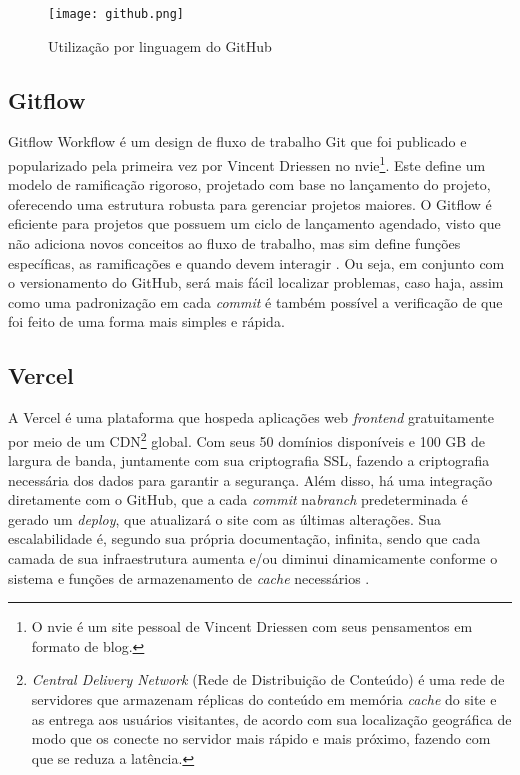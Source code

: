 \begin{figure}[H]
    \caption{\label{utilizacao_github}Utilização por linguagem do GitHub}
    \vspace{5pt}
    \centering
    \texttt{[image: github.png]}
    \vspace{5pt}
\end{figure}

\subsection{Gitflow}
Gitflow Workflow é um design de fluxo de trabalho Git que foi publicado e popularizado pela primeira vez por Vincent Driessen no nvie\footnote{O nvie é um site pessoal de Vincent Driessen com seus pensamentos em formato de blog.}. Este define um modelo de ramificação rigoroso, projetado com base no lançamento do projeto, oferecendo uma estrutura robusta para gerenciar projetos maiores. O Gitflow é eficiente para projetos que possuem um ciclo de lançamento agendado, visto que não adiciona novos conceitos ao fluxo de trabalho, mas sim define funções específicas, as ramificações e quando devem interagir \cite{SANTACROCE}. Ou seja, em conjunto com o versionamento do GitHub, será mais fácil localizar problemas, caso haja, assim como uma padronização em cada \textit{commit} é também possível a verificação de que foi feito de uma forma mais simples e rápida.

\subsection{Vercel}
A Vercel é uma plataforma que hospeda aplicações web \textit{frontend} gratuitamente por meio de um CDN\footnote{\textit{Central Delivery Network} (Rede de Distribuição de Conteúdo) é uma rede de servidores que armazenam réplicas do conteúdo em memória \textit{cache} do site e as entrega aos usuários visitantes, de acordo com sua localização geográfica de modo que os conecte no servidor mais rápido e mais próximo, fazendo com que se reduza a latência.}
global. Com seus 50 domínios disponíveis e 100 GB de largura de banda, juntamente com sua criptografia SSL, fazendo a criptografia necessária dos dados para garantir a segurança. Além disso, há uma integração diretamente com o GitHub, que a cada \textit{commit} na\textit{branch} predeterminada é gerado um \textit{deploy}, que atualizará o site com as últimas alterações. Sua escalabilidade é, segundo sua própria documentação, infinita, sendo que cada camada de sua infraestrutura aumenta e/ou diminui dinamicamente conforme o sistema e funções de armazenamento de \textit{cache} necessários \cite{VERCEL}. 

